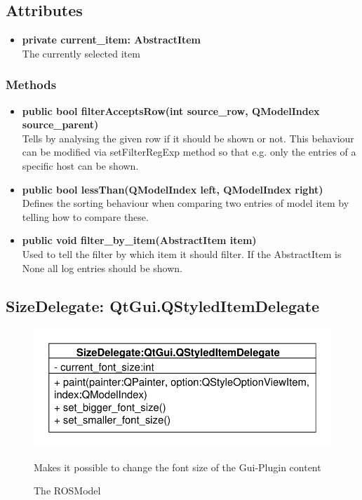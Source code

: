 \subsection{Attributes}
\begin{itemize}
  \item \textbf{private current\_item: AbstractItem}\\
  The currently selected item
\end{itemize}
\subsubsection{Methods}
\begin{itemize}
  \item \textbf{public bool filterAcceptsRow(int source\_row, QModelIndex
  source\_parent)}\\
  Tells by analysing the given row if it should be shown or not. This behaviour can be modified via setFilterRegExp method so that e.g. only the entries of a specific host can be shown.
  \item \textbf{public bool lessThan(QModelIndex left, QModelIndex right)}\\
    Defines the sorting behaviour when comparing two entries of model item by telling how to compare these.
  \item \textbf{public void filter\_by\_item(AbstractItem item)}\\
  Used to tell the filter by which item it should filter. If the AbstractItem is None all log entries should be shown.
\end{itemize}

\subsection{SizeDelegate: QtGui.QStyledItemDelegate}
\begin{figure}[htbp]
	\begin{minipage}[t]{7cm}
		\vspace{0pt}
		\centering
		\includegraphics[scale=0.6]{./diagram_pictures/SizeDelegate.pdf}
		\caption{The ROSModel}
	\end{minipage}
	\hfill
	\begin{minipage}[t]{7cm}
		\vspace{10pt}
		Makes it possible to change the font size of the Gui-Plugin content
	\end{minipage}
\end{figure} 
